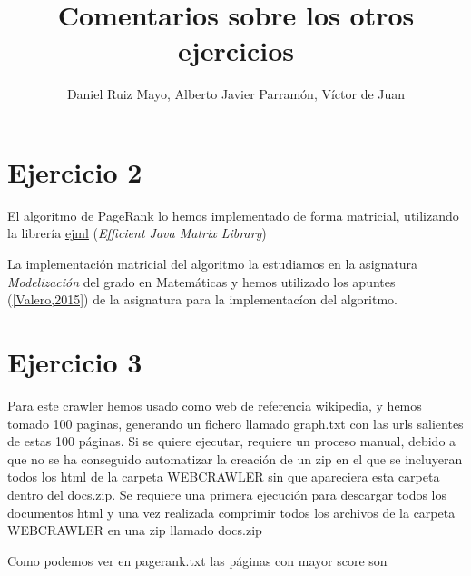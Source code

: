 \documentclass[palatino,nochap]{apuntes}
\title{Comentarios sobre los otros ejercicios}
\author{Daniel Ruiz Mayo, Alberto Javier Parramón, Víctor de Juan}
\date{}
\begin{document}
\pagestyle{plain}
\maketitle



\section{Ejercicio 2}

El algoritmo de PageRank lo hemos implementado de forma matricial, utilizando la librería \href{http://ejml.org/wiki/index.php?title=Main_Page}{ejml} (\textit{Efficient Java Matrix Library})

La implementación matricial del algoritmo la estudiamos en la asignatura \textit{Modelización} del grado en Matemáticas y hemos utilizado los apuntes (\href{https://www.dropbox.com/sh/kbymf37cykz77ha/AACL44kNShOUqhALNNnjdmcoa/modelizacion.pdf?dl=0}{[Valero,2015]}) de la asignatura para la implementacíon del algoritmo.
 \newpage
\section{Ejercicio 3}



Para este crawler hemos usado como web de referencia wikipedia, y hemos tomado 100 paginas, generando un fichero llamado graph.txt con las urls salientes de estas 100 páginas.
Si se quiere ejecutar, requiere un proceso manual, debido a que no se ha conseguido automatizar la creación de un zip en el que se incluyeran todos los html de la carpeta WEBCRAWLER sin que apareciera esta carpeta dentro del docs.zip.
Se requiere una primera ejecución para descargar todos los documentos html y una vez realizada comprimir todos los archivos de la carpeta WEBCRAWLER en una zip llamado docs.zip

Como podemos ver en pagerank.txt las páginas con mayor score son 
\end{document}
